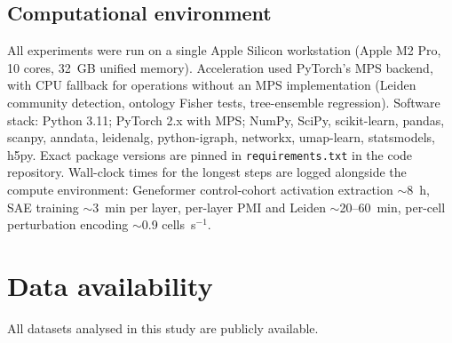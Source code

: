 \documentclass[onecolumn,11pt]{article}
\begin{document}
\subsection*{Computational environment}

All experiments were run on a single Apple Silicon workstation (Apple M2 Pro, 10 cores, 32~GB
unified memory). Acceleration used PyTorch's MPS backend, with CPU fallback for operations without
an MPS implementation (Leiden community detection, ontology Fisher tests, tree-ensemble regression).
Software stack: Python 3.11; PyTorch 2.x with MPS; NumPy, SciPy, scikit-learn, pandas, scanpy,
anndata, leidenalg, python-igraph, networkx, umap-learn, statsmodels, h5py. Exact package versions
are pinned in \texttt{requirements.txt} in the code repository. Wall-clock times for the longest
steps are logged alongside the compute environment: Geneformer control-cohort activation extraction
$\sim$8~h, SAE training $\sim$3~min per layer, per-layer PMI and Leiden $\sim$20--60~min,
per-cell perturbation encoding $\sim$0.9 cells~s$^{-1}$.

\section*{Data availability}
All datasets analysed in this study are publicly available.
\end{document}

